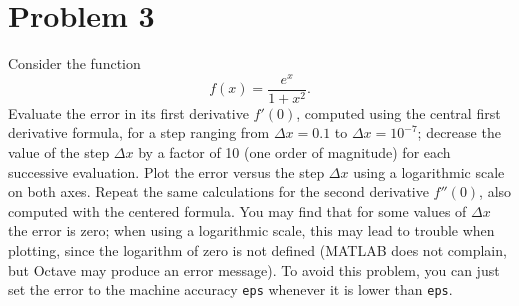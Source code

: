 \section{Problem 3}%
\label{sec:problem_3}
Consider the function
\begin{equation*}
  f(x) = \frac{e^{x}}{1 + x^{2}}.
\end{equation*}
Evaluate the error in its first derivative $f'(0)$, computed using the central first derivative formula, for a step ranging from $\Delta x = 0.1$ to $\Delta x = 10^{-7}$; decrease the value of the step $\Delta x$ by  a factor of 10 (one order of magnitude) for each successive evaluation. Plot the error versus the step $\Delta x$ using a logarithmic scale on both axes. Repeat the same calculations for the second derivative $f''(0)$, also computed with the centered formula. You may find that for some values of $\Delta x$ the error is zero; when using a logarithmic scale, this may lead to trouble when plotting, since the logarithm of zero is not defined (MATLAB does not complain, but Octave may produce an error message). To avoid this problem, you can just set the error to the machine accuracy \verb|eps| whenever it is lower than \verb|eps|.
